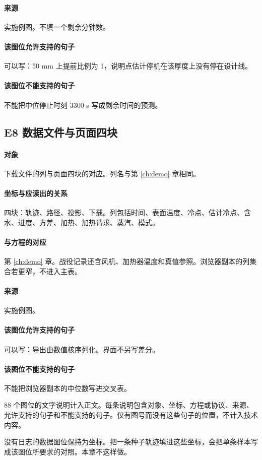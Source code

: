 \paragraph{来源}
实施例图。不填一个剩余分钟数。

\paragraph{该图位允许支持的句子}
可以写：50 mm 上提前比例为 1，说明点估计停机在该厚度上没有停在设计线。

\paragraph{该图位不能支持的句子}
不能把中位停止时刻 3300 s 写成剩余时间的预测。

\subsection{E8 数据文件与页面四块}
\paragraph{对象}
下载文件的列与页面四块的对应。列名与第 \ref{ch:demo} 章相同。

\paragraph{坐标与应读出的关系}
四块：轨迹、路径、投影、下载。列包括时间、表面温度、冷点、估计冷点、含水、进度、方差、加热、加热请求、蒸汽、模式。

\paragraph{与方程的对应}
第 \ref{ch:demo} 章。战役记录还含风机、加热器温度和真值参照。浏览器副本的列集合若更窄，不进入主表。

\paragraph{来源}
实施例图。

\paragraph{该图位允许支持的句子}
可以写：导出由数值核序列化。界面不另写差分。

\paragraph{该图位不能支持的句子}
不能把浏览器副本的中位数写进交叉表。


88 个图位的文字说明计入正文。每条说明包含对象、坐标、方程或协议、来源、允许支持的句子和不能支持的句子。仅有图号而没有这些句子的位置，不计入技术内容。

没有日志的数据图位保持为坐标。把一条种子轨迹填进这些坐标，会把单条样本写成该图位所要求的对照。本章不这样做。
